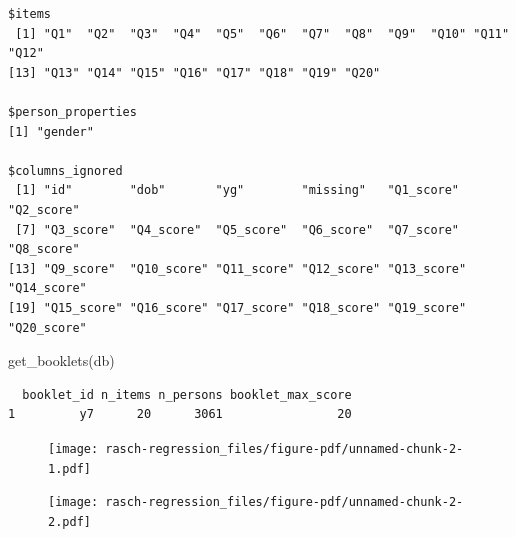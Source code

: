 \documentclass[
  letterpaper,
  DIV=11,
  numbers=noendperiod]{scrreprt}
\newenvironment{Shaded}{\begin{snugshade}}{\end{snugshade}}
\newcommand{\AttributeTok}[1]{\textcolor[rgb]{0.40,0.45,0.13}{#1}}
\newcommand{\ConstantTok}[1]{\textcolor[rgb]{0.56,0.35,0.01}{#1}}
\newcommand{\ControlFlowTok}[1]{\textcolor[rgb]{0.00,0.23,0.31}{#1}}
\newcommand{\DecValTok}[1]{\textcolor[rgb]{0.68,0.00,0.00}{#1}}
\newcommand{\FunctionTok}[1]{\textcolor[rgb]{0.28,0.35,0.67}{#1}}
\newcommand{\NormalTok}[1]{\textcolor[rgb]{0.00,0.23,0.31}{#1}}
\newcommand{\OtherTok}[1]{\textcolor[rgb]{0.00,0.23,0.31}{#1}}
\newcommand{\SpecialCharTok}[1]{\textcolor[rgb]{0.37,0.37,0.37}{#1}}
\newcommand{\StringTok}[1]{\textcolor[rgb]{0.13,0.47,0.30}{#1}}
\begin{document}
\begin{verbatim}
$items
 [1] "Q1"  "Q2"  "Q3"  "Q4"  "Q5"  "Q6"  "Q7"  "Q8"  "Q9"  "Q10" "Q11" "Q12"
[13] "Q13" "Q14" "Q15" "Q16" "Q17" "Q18" "Q19" "Q20"

$person_properties
[1] "gender"

$columns_ignored
 [1] "id"        "dob"       "yg"        "missing"   "Q1_score"  "Q2_score" 
 [7] "Q3_score"  "Q4_score"  "Q5_score"  "Q6_score"  "Q7_score"  "Q8_score" 
[13] "Q9_score"  "Q10_score" "Q11_score" "Q12_score" "Q13_score" "Q14_score"
[19] "Q15_score" "Q16_score" "Q17_score" "Q18_score" "Q19_score" "Q20_score"
\end{verbatim}

\begin{Shaded}
\begin{Highlighting}[]
\FunctionTok{get\_booklets}\NormalTok{(db)}
\end{Highlighting}
\end{Shaded}

\begin{verbatim}
  booklet_id n_items n_persons booklet_max_score
1         y7      20      3061                20
\end{verbatim}

\begin{Shaded}
\end{Shaded}

\begin{figure}[H]

{\centering \texttt{[image: rasch-regression\_files/figure-pdf/unnamed-chunk-2-1.pdf]}

}

\end{figure}

\begin{figure}[H]

{\centering \texttt{[image: rasch-regression\_files/figure-pdf/unnamed-chunk-2-2.pdf]}

}

\end{figure}
\end{document}
